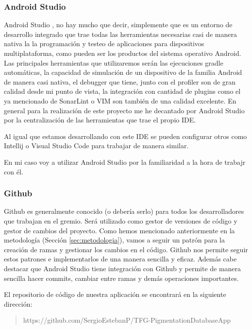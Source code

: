 \subsubsection{Android Studio}
Android Studio \cite{androidstudio}, no hay mucho que decir, simplemente que es un entorno de desarrollo integrado que trae todas las herramientas necesarias casi de manera nativa la la programación y testeo de aplicaciones para dispositivos multiplataforma, como pueden ser los productos del sistema operativo Android. Las principales herramientas que utilizaremos serán las ejecuciones gradle automáticas, la capacidad de simulación de un dispositivo de la familia Android de manera casi nativa, el debugger que tiene, junto con el profiler son de gran calidad desde mi punto de vista, la integración con cantidad de plugins como el ya mencionado de SonarLint o VIM son también de una calidad excelente. En general para la realización de este proyecto me he decantado por Android Studio por la centralización de las herramientas que trae el propio IDE. 

Al igual que estamos desarrollando con este IDE se pueden configurar otros como Intellij o Visual Studio Code para trabajar de manera similar. 

En mi caso voy a utilizar Android Studio por la familiaridad a la hora de trabajr con él. 

\subsubsection{Github}
Github \cite{github} es generalmente conocido (o debería serlo) para todos los desarrolladores que trabajan en el gremio. Será utilizado como gestor de versiones de código y gestor de cambios del proyecto. 
Como hemos mencionado anteriormente en la metodología (Sección \ref{sec:metodologia}), vamos a seguir un patrón para la creación de ramas y gestionar los cambios en el código. Github nos permite seguir estos patrones e implementarlos de una manera sencilla y eficaz. Además cabe destacar que Android Studio tiene integración con Github y permite de manera sencilla hacer commits, cambiar entre ramas y demás operaciones importantes. 

El repositorio de código de nuestra aplicación se encontrará en la siguiente dirección: 

\begin{quote}
    https://github.com/SergioEstebanP/TFG-PigmentationDatabaseApp
\end{quote}

